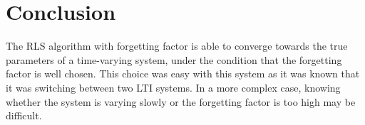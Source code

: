 
\section{Conclusion}

The RLS algorithm with forgetting factor is able to converge towards the true parameters of a time-varying system, under the condition that the forgetting factor is well chosen. This choice was easy with this system as it was known that it was switching between two LTI systems. In a more complex case, knowing whether the system is varying slowly or the forgetting factor is too high may be difficult. 




